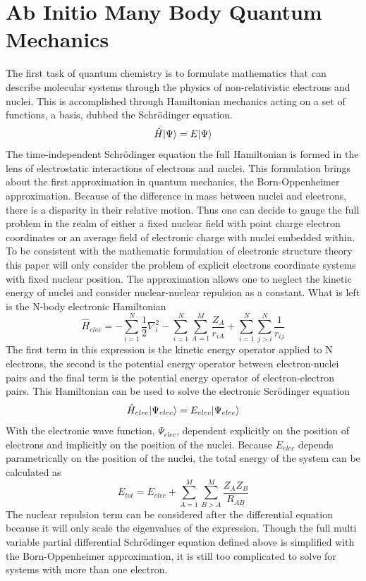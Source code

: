 
\section{Ab Initio Many Body Quantum Mechanics}
 The first task of quantum chemistry is to formulate mathematics that can describe molecular systems through the physics of non-relativistic electrons and nuclei. This is accomplished through Hamiltonian mechanics acting on a set of functions, a basis, dubbed the Schr{\"o}dinger equation.
   \begin{equation}
    \hat{H}| \Psi \rangle = E| \Psi \rangle
   \end{equation}
  The time-independent Schr{\"o}dinger equation the full Hamiltonian is formed in the lens of electrostatic interactions of electrons and nuclei.  This formulation brings about the first approximation in quantum mechanics, the Born-Oppenheimer approximation.\cite{Szabo 1996}  Because of the difference in mass between nuclei and electrons, there is a disparity in their relative motion.  Thus one can decide to gauge the full problem in the realm of either a fixed nuclear field with point charge electron coordinates or an average field of electronic charge with nuclei embedded within. To be consistent with the mathematic formulation of electronic structure theory this paper will only consider the problem of explicit electrons coordinate systems with fixed nuclear position.  The approximation allows one to neglect the kinetic energy of nuclei and consider nuclear-nuclear repulsion as a constant.  What is left is the N-body electronic Hamiltonian
   \begin{equation}
    \hat{H}_{elec} = -\sum_{i=1}^{N} \frac{1}{2} \nabla_{i}^{2} - \sum_{i=1}^{N}\sum_{A=1}^{M} \frac{Z_A}{r_{iA}} + \sum_{i=1}^{N}\sum_{j>i}^{N} \frac{1}{r_{ij}}
   \end{equation}
  The first term in this expression is the kinetic energy operator applied to N electrons, the second is the potential energy operator between electron-nuclei pairs and the final term is the potential energy operator of electron-electron pairs.  This Hamiltonian can be used to solve the electronic Scr{\"o}dinger equation
    \begin{equation}
     \hat{H}_{elec} | \Psi_{elec} \rangle = E_{elec}| \Psi_{elec} \rangle
    \end{equation}
  With the electronic wave function, $\Psi_{elec}$, dependent explicitly on the position of electrons and implicitly on the position of the nuclei.  Because $E_{elec}$ depends parametrically on the position of the nuclei, the total energy of the system can be calculated as 
    \begin{equation}
      E_{tot} = E_{elec} + \sum_{A=1}^{M} \sum_{B>A}^{M} \frac{Z_A Z_B}{R_{AB}}
    \end{equation}
  The nuclear repulsion term can be considered after the differential equation because it will only scale the eigenvalues of the expression.  Though the full multi variable partial differential Schr{\"o}dinger equation defined above is simplified with the Born-Oppenheimer approximation, it is still too complicated to solve for systems with more than one electron.\cite{Szabo 1970}

